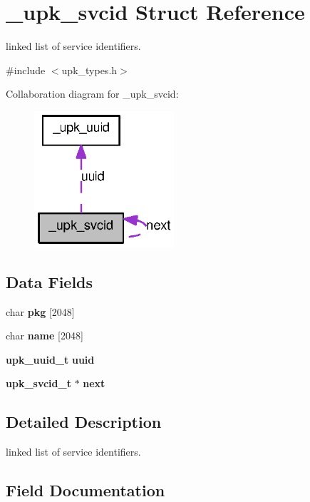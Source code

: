 \section{\_\-upk\_\-svcid Struct Reference}
\label{struct__upk__svcid}


linked list of service identifiers.  




{\ttfamily \#include $<$upk\_\-types.h$>$}



Collaboration diagram for \_\-upk\_\-svcid:\nopagebreak
\begin{figure}[H]
\begin{center}
\leavevmode
\includegraphics[width=147pt]{struct__upk__svcid__coll__graph}
\end{center}
\end{figure}
\subsection*{Data Fields}
\begin{DoxyCompactItemize}
\item 
char {\bf pkg} [2048]
\item 
char {\bf name} [2048]
\item 
{\bf upk\_\-uuid\_\-t} {\bf uuid}
\item 
{\bf upk\_\-svcid\_\-t} $\ast$ {\bf next}
\end{DoxyCompactItemize}


\subsection{Detailed Description}
linked list of service identifiers. 

\subsection{Field Documentation}
